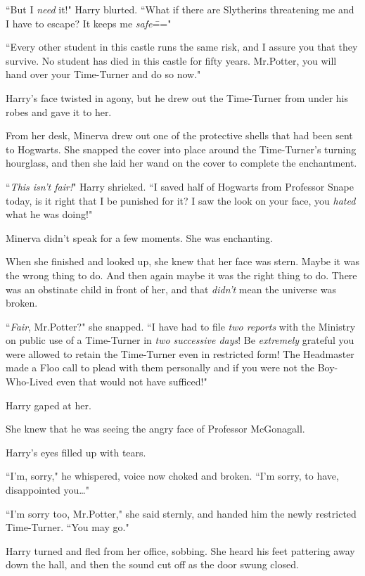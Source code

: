 ``But I \emph{need} it!" Harry blurted. ``What if there are Slytherins threatening me and I have to escape? It keeps me \emph{safe}\==="

``Every other student in this castle runs the same risk, and I assure you that they survive. No student has died in this castle for fifty years. Mr.\?Potter, you will hand over your Time-Turner and do so now."

Harry's face twisted in agony, but he drew out the Time-Turner from under his robes and gave it to her.

From her desk, Minerva drew out one of the protective shells that had been sent to Hogwarts. She snapped the cover into place around the Time-Turner's turning hourglass, and then she laid her wand on the cover to complete the enchantment.

``\emph{This isn't fair!}" Harry shrieked. ``I saved half of Hogwarts from Professor Snape today, is it right that I be punished for it? I saw the look on your face, you \emph{hated} what he was doing!"

Minerva didn't speak for a few moments. She was enchanting.

When she finished and looked up, she knew that her face was stern. Maybe it was the wrong thing to do. And then again maybe it was the right thing to do. There was an obstinate child in front of her, and that \emph{didn't} mean the universe was broken.

``\emph{Fair}, Mr.\?Potter?" she snapped. ``I have had to file \emph{two reports} with the Ministry on public use of a Time-Turner in \emph{two successive days}! Be \emph{extremely} grateful you were allowed to retain the Time-Turner even in restricted form! The Headmaster made a Floo call to plead with them personally and if you were not the Boy-Who-Lived even that would not have sufficed!"

Harry gaped at her.

She knew that he was seeing the angry face of Professor McGonagall.

Harry's eyes filled up with tears.

``I'm, sorry," he whispered, voice now choked and broken. ``I'm sorry, to have, disappointed you{\ldots}"

``I'm sorry too, Mr.\?Potter," she said sternly, and handed him the newly restricted Time-Turner. ``You may go."

Harry turned and fled from her office, sobbing. She heard his feet pattering away down the hall, and then the sound cut off as the door swung closed.

